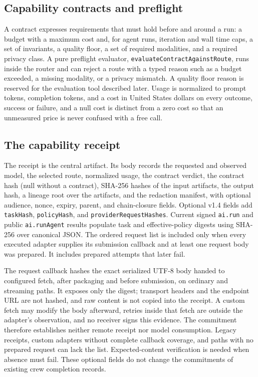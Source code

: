 \documentclass[conference]{IEEEtran}
\newcommand{\code}[1]{\texttt{\small #1}}
\begin{document}
\subsection{Capability contracts and preflight}

A contract expresses requirements that must hold before and around a run: a budget
with a maximum cost and, for agent runs, iteration and wall time caps, a set of
invariants, a quality floor, a set of required modalities, and a required privacy
class. A pure preflight evaluator, \code{evaluateContractAgainstRoute}, runs inside
the router and can reject a route with a typed reason such as a budget exceeded, a
missing modality, or a privacy mismatch. A quality floor reason is reserved for the
evaluation tool described later. Usage is normalized to prompt tokens, completion
tokens, and a cost in United States dollars on every outcome, success or failure, and
a null cost is distinct from a zero cost so that an unmeasured price is never confused
with a free call.

\subsection{The capability receipt}

The receipt is the central artifact. Its body records the requested and observed
model, the selected route, normalized usage, the contract verdict, the contract hash
(null without a contract), SHA-256 hashes of the input artifacts, the output hash, a
lineage root over the artifacts, and the redaction manifest, with optional audience,
nonce, expiry, parent, and chain-closure fields. Optional v1.4 fields add
\code{taskHash}, \code{policyHash}, and \code{providerRequestHashes}.
Current signed \code{ai.run} and public \code{ai.runAgent} results populate task and
effective-policy digests using SHA-256 over canonical JSON. The ordered request list
is included only when every executed adapter supplies its submission callback and
at least one request body was prepared. It includes prepared attempts that later fail.

The request callback hashes the exact serialized UTF-8 body handed to configured
fetch, after packaging and before submission, on ordinary and streaming paths.
It exposes only the digest; transport headers and the endpoint URL are not hashed,
and raw content is not copied into the receipt.
A custom fetch may modify the body afterward, retries inside that fetch are outside
the adapter's observation, and no receiver signs this evidence. The commitment
therefore establishes neither remote receipt nor model consumption. Legacy receipts,
custom adapters without complete callback coverage, and paths with no prepared
request can lack the list. Expected-content verification is needed when absence
must fail. These optional fields do not change the commitments of existing crew
completion records.
\end{document}
